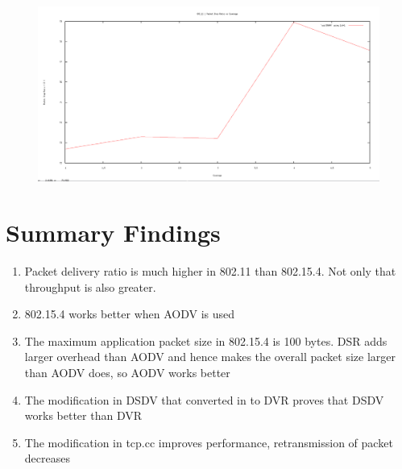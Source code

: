 \documentclass[12pt]{article}
\begin{document}
\begin{figure}[H]
	\centering
	\includegraphics[scale=	0.26]{image/802.15.4/Packetdropratio_vs_coverage.png}
\end{figure}










\newpage
\section{Summary Findings}
\begin{enumerate}
    \item Packet delivery ratio is much higher in 802.11 than 802.15.4. Not only that throughput is also greater.
    
    \item 802.15.4 works better when AODV is used
    \item The maximum application packet size in 
802.15.4 is 100 bytes. DSR adds larger overhead than AODV and hence 
makes the overall packet size larger than AODV does, so AODV works better
    
    \item The modification in DSDV that converted in to DVR proves that DSDV works better than DVR
    
    \item The modification in tcp.cc improves performance, retransmission of packet decreases
\end{enumerate}

\end{document}
